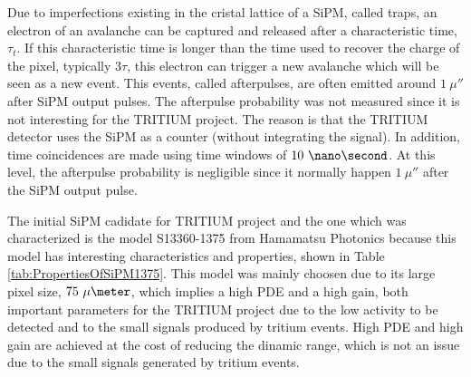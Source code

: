 Due to imperfections existing in the cristal lattice of a SiPM, called traps, an electron of an avalanche can be captured and released after a characteristic time, $\tau_t$. If this characteristic time is longer than the time used to recover the charge of the pixel, typically $3\tau$, this electron can trigger a new avalanche which will be seen as a new event. This events, called  afterpulses, are often emitted around $1~\mu\second$ after SiPM output pulses. The afterpulse probability was not measured since it is not interesting for the TRITIUM project. The reason is that the TRITIUM detector uses the SiPM as a counter (without integrating the signal). In addition, time coincidences are made using time windows of $10~\nano\second$. At this level, the afterpulse probability is negligible since it normally happen $1~\mu\second$ after the SiPM output pulse.

The initial SiPM cadidate for TRITIUM project and the one which was characterized is the model S13360-1375 from Hamamatsu Photonics \cite{DataSheetHammamatsu_1_SiPM_1375} because this model has interesting characteristics and properties, shown in Table \ref{tab:PropertiesOfSiPM1375}. This model was mainly choosen due to its large pixel size, $75~\mu\meter$, which implies a high PDE and a high gain, both important parameters for the TRITIUM project due to the low activity to be detected and to the small signals produced by tritium events. High PDE and high gain are achieved at the cost of reducing the dinamic range, which is not an issue due to the small signals generated by tritium events. 

